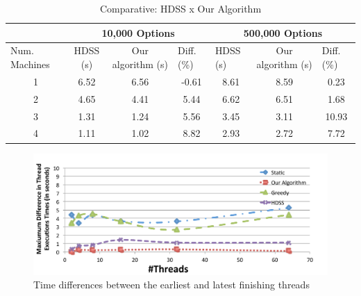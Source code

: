 \documentclass[journal]{IEEEtran}
\begin{document}
\begin{table}[htb]
\centering
\caption{Comparative: HDSS x Our Algorithm}
\begin{tabular}{c|c|c|c|c|c|c|}
\cline{2-7}
\multicolumn{1}{l|}{}                 & \multicolumn{3}{c|}{10,000 Options}                              & \multicolumn{3}{c|}{500,000 Options}                                                  \\ \hline
\multicolumn{1}{|l|}{Num. Machines} & HDSS (s) & Our algorithm (s) & \multicolumn{1}{l|}{Diff. (\%)} & \multicolumn{1}{l|}{HDSS (s)} & Our algorithm (s) & \multicolumn{1}{l|}{Diff. (\%)} \\ \hline
\multicolumn{1}{|c|}{1 }       & 6.52     & 6.56              &    -0.61                       
			 & 8.61                          & 8.59              &   0.23                         \\ \hline
\multicolumn{1}{|c|}{2 }      & 4.65     & 4.41              &    5.44                         
				& 6.62                          & 6.51              & 1.68                            \\ \hline
\multicolumn{1}{|c|}{3 }      & 1.31     & 1.24              & 5.56                            
			& 3.45                          & 3.11              &         10.93                    \\ \hline
\multicolumn{1}{|c|}{4 }      & 1.11     & 1.02              & 8.82                       
			    & 2.93                          & 2.72              &         7.72                  \\ \hline
\end{tabular}
\label{table: black}
\end{table}


\begin{figure}[htb]
	\begin{center}
	\centering
			\includegraphics[scale=0.33]{MaximoDiferenca_black_novo.pdf}
	\caption{Time differences between the earliest and latest finishing threads}
	\label{fig:diferencaThreadsBlack}
	\end{center}
\end{figure}
\end{document}
